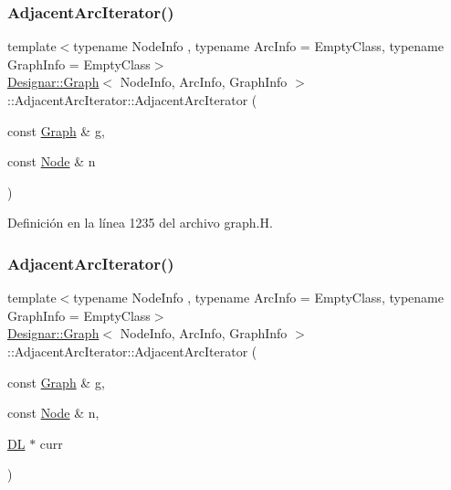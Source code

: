 \subsubsection{\texorpdfstring{Adjacent\+Arc\+Iterator()}{AdjacentArcIterator()}\hspace{0.1cm}{\footnotesize\ttfamily [2/5]}}
{\footnotesize\ttfamily template$<$typename Node\+Info , typename Arc\+Info  = Empty\+Class, typename Graph\+Info  = Empty\+Class$>$ \\
\hyperlink{class_designar_1_1_graph}{Designar\+::\+Graph}$<$ Node\+Info, Arc\+Info, Graph\+Info $>$\+::Adjacent\+Arc\+Iterator\+::\+Adjacent\+Arc\+Iterator (\begin{DoxyParamCaption}\item[{const \hyperlink{class_designar_1_1_graph}{Graph} \&}]{g,  }\item[{const \hyperlink{class_designar_1_1_graph_a5dfc7dba9d092ac489c72e40390c37d0}{Node} \&}]{n }\end{DoxyParamCaption})\hspace{0.3cm}{\ttfamily [inline]}}



Definición en la línea 1235 del archivo graph.\+H.

\mbox{\label{class_designar_1_1_graph_1_1_adjacent_arc_iterator_a97e3e5909f6e9b9b6b55cbc0fb2d5263}} 
\subsubsection{\texorpdfstring{Adjacent\+Arc\+Iterator()}{AdjacentArcIterator()}\hspace{0.1cm}{\footnotesize\ttfamily [3/5]}}
{\footnotesize\ttfamily template$<$typename Node\+Info , typename Arc\+Info  = Empty\+Class, typename Graph\+Info  = Empty\+Class$>$ \\
\hyperlink{class_designar_1_1_graph}{Designar\+::\+Graph}$<$ Node\+Info, Arc\+Info, Graph\+Info $>$\+::Adjacent\+Arc\+Iterator\+::\+Adjacent\+Arc\+Iterator (\begin{DoxyParamCaption}\item[{const \hyperlink{class_designar_1_1_graph}{Graph} \&}]{g,  }\item[{const \hyperlink{class_designar_1_1_graph_a5dfc7dba9d092ac489c72e40390c37d0}{Node} \&}]{n,  }\item[{\hyperlink{class_designar_1_1_d_l}{DL} $\ast$}]{curr }\end{DoxyParamCaption})\hspace{0.3cm}{\ttfamily [inline]}}



